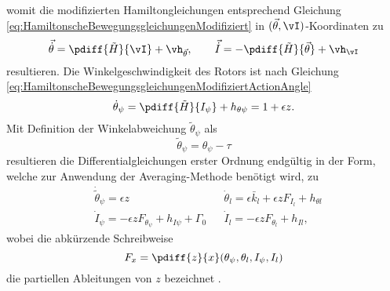 womit die modifizierten Hamiltongleichungen entsprechend Gleichung \eqref{eq:HamiltonscheBewegungsgleichungenModifiziert} in $(\vec{\theta},\vI)$-Koordinaten zu
\begin{equation}
	\vec{\dot{\theta}} = \pdiff{\tilde{H}}{{\vI}} + \vh_{\vec{\theta}}, 					
	\qquad		 \vec{\dot{I}} = - \pdiff{\tilde{H}}{{\vec{\theta}}} + \vh_{\vI}
	\label{eq:HamiltonscheBewegungsgleichungenModifiziertActionAngle}
\end{equation}
resultieren.
%
%
%
%
%
%
%
Die Winkelgeschwindigkeit des Rotors ist nach Gleichung 	\eqref{eq:HamiltonscheBewegungsgleichungenModifiziertActionAngle}
\begin{equation}
	\dot{\theta}_{\psi} = \pdiff{\tilde{H}}{{I_{\psi}}} + h_{\theta \psi} = 1 + \epsilon z. 				
	\label{eq:WinkelgeschwindigkeitActionAngle}
\end{equation}
%
%
%
Mit Definition der Winkelabweichung $\tilde{\theta}_{\psi}$ als
\begin{equation}
	\tilde{\theta}_{\psi}	= \theta_{\psi} - \tau
	\label{eq:AbweichungVomRotorwinkelActionAngle}
\end{equation}
resultieren die Differentialgleichungen erster Ordnung endgültig in der Form, 
welche zur Anwendung der Averaging-Methode benötigt wird, zu 
%
%
% 
\begin{align}
		& \dot{\tilde{\theta}}_{\psi} = \epsilon z  &  
		& \dot{\theta}_{l} = \epsilon \bar{k}_l + \epsilon z F_{I_l} + h_{\theta l} \\
		& \dot{I}_{\psi} = - \epsilon z F_{\theta_\psi} + h_{I \psi} + \Gamma_0 &
		& \dot{I}_{l} = - \epsilon z F_{\theta_l} + h_{Il},
	\label{eq:GleichungenVorAveragingOhneMistuningTeil2}
\end{align}
wobei die abkürzende Schreibweise
\begin{equation}
	F_x	 = \pdiff{z}{x}(\theta_{\psi},\theta_l,I_{\psi},I_l)			
	\label{eq:DefinitionVonAbkuerzungFuerF}
\end{equation}
die partiellen Ableitungen von $z$ bezeichnet \cite{Mayet:Tautochronic}.

